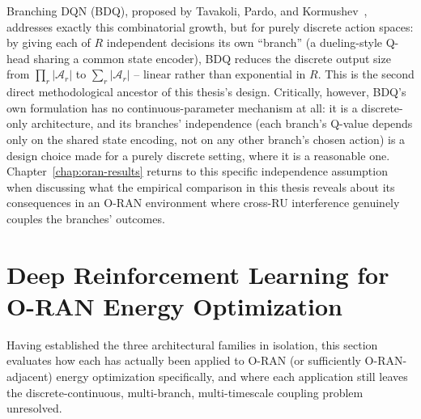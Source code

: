 Branching DQN (BDQ), proposed by Tavakoli, Pardo, and
Kormushev~\cite{tavakoli2018branching}, addresses exactly this combinatorial
growth, but for purely discrete action spaces: by giving each of $R$
independent decisions its own ``branch'' (a dueling-style Q-head sharing a
common state encoder), BDQ reduces the discrete output size from
$\prod_r |\mathcal{A}_r|$ to $\sum_r |\mathcal{A}_r|$ -- linear rather than
exponential in $R$. This is the second direct methodological ancestor of
this thesis's design. Critically, however, BDQ's own formulation has no
continuous-parameter mechanism at all: it is a discrete-only architecture,
and its branches' independence (each branch's Q-value depends only on the
shared state encoding, not on any other branch's chosen action) is a
design choice made for a purely discrete setting, where it is a reasonable
one. Chapter~\ref{chap:oran-results} returns to this specific independence
assumption when discussing what the empirical comparison in this thesis
reveals about its consequences in an O-RAN environment where cross-RU
interference genuinely couples the branches' outcomes.

\section{Deep Reinforcement Learning for O-RAN Energy Optimization}
\label{sec:lit-oran-energy}

Having established the three architectural families in isolation, this
section evaluates how each has actually been applied to O-RAN (or
sufficiently O-RAN-adjacent) energy optimization specifically, and where
each application still leaves the discrete-continuous, multi-branch,
multi-timescale coupling problem unresolved.

